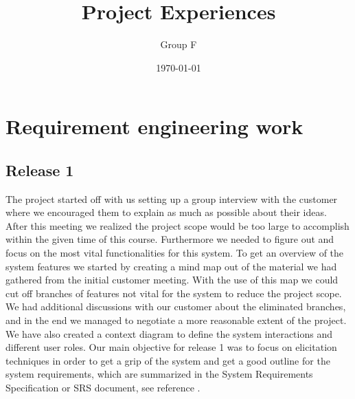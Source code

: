 \documentclass[10pt]{article}
\begin{document}
\makeatletter
\renewcommand{\@biblabel}[1]{\quad#1.}
\makeatother


\pagestyle{myheadings}





\begin{titlepage}
\title{Project Experiences}
\author{Group F}
\date{\today}
\maketitle
\thispagestyle{empty}
\end{titlepage}

\tableofcontents
\thispagestyle{empty}
\newpage
{}

\section{Requirement engineering work}

\subsection{Release 1}
The project started off with us setting up a group interview with the customer where we encouraged them to explain as much as possible about their ideas. After this meeting we realized the project scope would be too large to accomplish within the given time of this course. Furthermore we needed to figure out and focus on the most vital functionalities for this system.
To get an overview of the system features we started by creating a mind map out of the material we had gathered from the initial customer meeting. With the use of this map we could cut off branches of features not vital for the system to reduce the project scope.
We had additional discussions with our customer about the eliminated branches, and in the end we managed to negotiate a more reasonable extent of the project.
\newline We have also created a context diagram to define the system interactions and different user roles.
Our main objective for release 1 was to focus on elicitation techniques in order to get a grip of the system and get a good outline for the system requirements, which are summarized in the System Requirements Specification or SRS document, see reference \cite{srs}.
\end{document}
